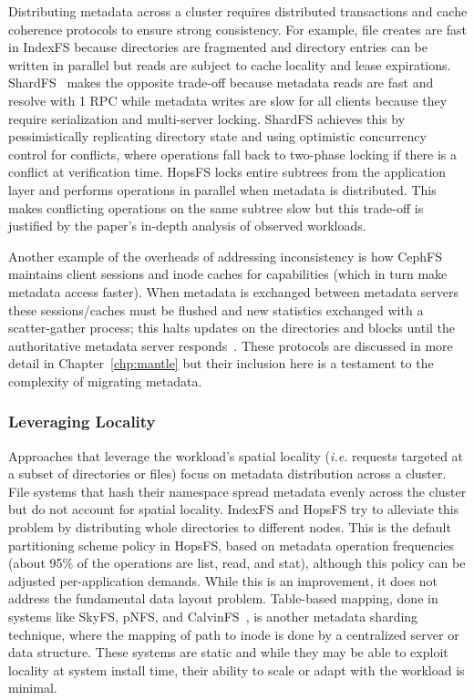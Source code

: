 Distributing metadata across a cluster requires distributed transactions and
cache coherence protocols to ensure strong consistency.  For example, file
creates are fast in IndexFS because directories are fragmented and directory
entries can be written in parallel but reads are subject to cache locality and
lease expirations.  ShardFS~\cite{xiao:socc15-shardfs} makes the opposite
trade-off because metadata reads are fast and resolve with 1 RPC while metadata
writes are slow for all clients because they require serialization and
multi-server locking.  ShardFS achieves this by pessimistically replicating
directory state and using optimistic concurrency control for conflicts, where
operations fall back to two-phase locking if there is a conflict at
verification time. HopsFS locks entire subtrees from the application layer and
performs operations in parallel when metadata is distributed. This makes
conflicting operations on the same subtree slow but this trade-off is
justified by the paper's in-depth analysis of observed workloads.

Another example of the overheads of addressing inconsistency is how CephFS
maintains client sessions and inode caches for capabilities (which in turn make
metadata access faster). When metadata is exchanged between metadata servers
these sessions/caches must be flushed and new statistics exchanged with a
scatter-gather process; this halts updates on the directories and blocks until
the authoritative metadata server responds~\cite{docs:cephinternals}.  These
protocols are discussed in more detail in Chapter~\ref{chp:mantle} but their
inclusion here is a testament to the complexity of migrating metadata.

\subsubsection{Leveraging Locality}

Approaches that leverage the workload's spatial locality ({\it i.e.} requests
targeted at a subset of directories or files) focus on metadata distribution
across a cluster. File systems that hash their namespace spread metadata evenly
across the cluster but do not account for spatial locality.  IndexFS and HopsFS
try to alleviate this problem by distributing whole directories to different
nodes. This is the default partitioning scheme policy in HopsFS, based on
metadata operation frequencies (about 95\% of the operations are list, read, and
stat), although this policy can be adjusted per-application demands.  While
this is an improvement, it does not address the fundamental data layout
problem.  Table-based mapping, done in systems like SkyFS, pNFS, and
CalvinFS~\cite{thomson:fast2015-calvinfs}, is another metadata sharding
technique, where the mapping of path to inode is done by a centralized server
or data structure. These systems are static and while they may be able to
exploit locality at system install time, their ability to scale or adapt with
the workload is minimal.

